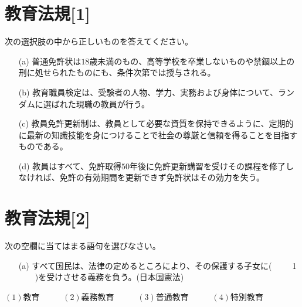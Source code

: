 \documentclass[10pt]{jarticle}
\begin{document}
\section{教育法規[1]}
次の選択肢の中から正しいものを答えてください。
\begin{itemize}
  \item[(a)]普通免許状は$18$歳未満のもの、高等学校を卒業しないものや禁錮以上の刑に処せられたものにも、条件次第では授与される。
  \item[(b)]教育職員検定は、受験者の人物、学力、実務および身体について、ランダムに選ばれた現職の教員が行う。
  \item[(c)]教員免許更新制は、教員として必要な資質を保持できるように、定期的に最新の知識技能を身につけることで社会の尊厳と信頼を得ることを目指すものである。
  \item[(d)]教員はすべて、免許取得$50$年後に免許更新講習を受けその課程を修了しなければ、免許の有効期間を更新できず免許状はその効力を失う。
\end{itemize}
\section{教育法規[2]}
次の空欄に当てはまる語句を選びなさい。
\begin{itemize}
  \item[(a)]すべて国民は、法律の定めるところにより、その保護する子女に(\ \ \ \ \ 1 \ \ \ \ )を受けさせる義務を負う。(日本国憲法)
\end{itemize}
\begin{center}
  $(1)$教育 \ \ \ \ \ $(2)$義務教育 \ \ \ \ \ $(3)$普通教育 \ \ \ \ \  $(4)$特別教育
\end{center}
\end{document}
